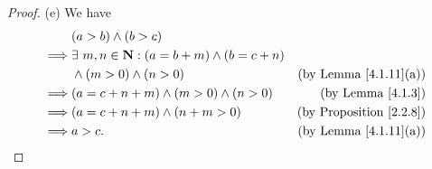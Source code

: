 \begin{proof}{(e)}
    We have
    \begin{align*}
                 & (a > b) \land (b > c)                                                                              \\
        \implies & \exists\ m, n \in \mathbf{N} : (a = b + m) \land (b = c + n)                                       \\
                 & \land (m > 0) \land (n > 0)                                  & \text{(by Lemma \ref{4.1.11}(a))}   \\
        \implies & (a = c + n + m) \land (m > 0) \land (n > 0)                  & \text{(by Lemma \ref{4.1.3})}       \\
        \implies & (a = c + n + m) \land (n + m > 0)                            & \text{(by Proposition \ref{2.2.8})} \\
        \implies & a > c.                                                       & \text{(by Lemma \ref{4.1.11}(a))}
    \end{align*}
\end{proof}


